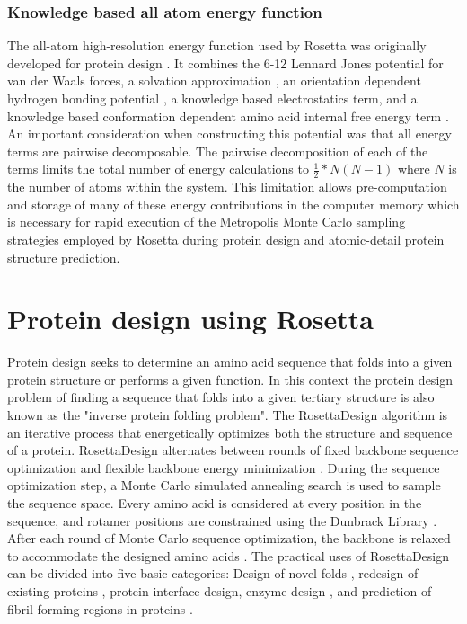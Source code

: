 \subsubsection{Knowledge based all atom energy function}
The all-atom high-resolution energy function used by Rosetta was originally developed for protein design  \citep{Kuhlman:2000tc,Kuhlman:2003kp}.
It combines the 6-12 Lennard Jones potential for van der Waals forces, a solvation approximation  \citep{Lazaridis:1999wi}, an orientation dependent hydrogen bonding potential  \citep{Kortemme:2003td}, a knowledge based electrostatics term, and a knowledge based conformation dependent amino acid internal free energy term  \citep{Dunbrack:1993jt}.
An important consideration when constructing this potential was that all energy terms are pairwise decomposable.
The pairwise decomposition of each of the terms limits the total number of energy calculations to $\frac{1}{2}*N(N-1)$ where $N$ is the number of atoms within the system.
This limitation allows pre-computation and storage of many of these energy contributions in the computer memory which is necessary for rapid execution of the Metropolis Monte Carlo sampling strategies employed by Rosetta during protein design and atomic-detail protein structure prediction.

\section{Protein design using Rosetta}
Protein design seeks to determine an amino acid sequence that folds into a given protein structure or performs a given function.
In this context the protein design problem of finding a sequence that folds into a given tertiary structure is also known as the "inverse protein folding problem".
The RosettaDesign  \citep{Kuhlman:2003kp} algorithm is an iterative process that energetically optimizes both the structure and sequence of a protein.
RosettaDesign alternates between rounds of fixed backbone sequence optimization and flexible backbone energy minimization  \citep{Kuhlman:2003kp}.
During the sequence optimization step, a Monte Carlo simulated annealing search is used to sample the sequence space.
Every amino acid is considered at every position in the sequence, and rotamer positions are constrained using the Dunbrack Library  \citep{Dunbrack:1993jt}.
After each round of Monte Carlo sequence optimization, the backbone is relaxed to accommodate the designed amino acids  \citep{Kuhlman:2003kp}.
The practical uses of RosettaDesign can be divided into five basic categories: Design of novel folds  \citep{Kuhlman:2003kp}, redesign of existing proteins  \citep{Korkegian:2005it}, protein interface design, enzyme design  \citep{Jiang:2008jk}, and prediction of fibril forming regions in proteins  \citep{Thompson:2006cj}.

